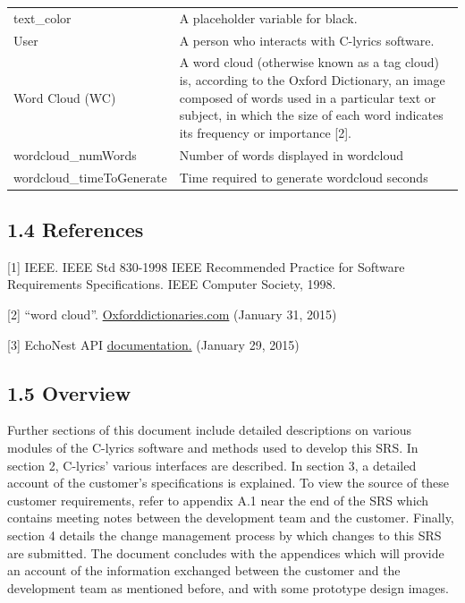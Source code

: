\documentclass[]{article}
\begin{document}
\begin{tabular}{p{4cm}|p{8cm}}
text\_color & A placeholder variable for black. \\
User & A person who interacts with C-lyrics software. \\
Word Cloud (WC) & A word cloud (otherwise known as a tag cloud) is, according to the Oxford Dictionary, an image composed of words used in a particular text or subject, in which the size of each word indicates its frequency or importance [2]. \\
wordcloud\_numWords & Number of words displayed in wordcloud\\
wordcloud\_timeToGenerate & Time required to generate wordcloud seconds \\
\end{tabular}

\subsection{1.4 References}\label{references}

{[}1{]} IEEE. IEEE Std 830-1998 IEEE Recommended Practice for Software
Requirements Specifications. IEEE Computer Society, 1998.

{[}2{]} ``word cloud''.
\href{http://www.oxforddictionaries.com/us/definition/american_english/word-cloud}{Oxforddictionaries.com}
(January 31, 2015)

{[}3{]} EchoNest API
\href{http://developer.echonest.com/docs/v4/index.html\#overview}{documentation.}
(January 29, 2015)

\subsection{1.5 Overview}\label{overview}

Further sections of this document include detailed descriptions on
various modules of the C-lyrics software and methods used to develop
this SRS. In section 2, C-lyrics' various interfaces are described. In
section 3, a detailed account of the customer's specifications is
explained. To view the source of these customer requirements, refer to
appendix A.1 near the end of the SRS which contains meeting notes
between the development team and the customer. Finally, section 4
details the change management process by which changes to this SRS are
submitted. The document concludes with the appendices which will provide
an account of the information exchanged between the customer and the
development team as mentioned before, and with some prototype design
images.
\end{document}
